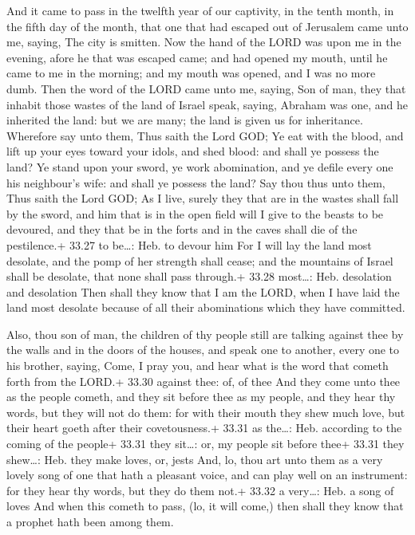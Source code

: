  And it came to pass in the twelfth year of our
captivity, in the tenth month, in the fifth day of the month, that one
that had escaped out of Jerusalem came unto me, saying, The city is
smitten.  Now the hand of the LORD was upon me in the
evening, afore he that was escaped came; and had opened my mouth, until
he came to me in the morning; and my mouth was opened, and I was no more
dumb.  Then the word of the LORD came unto me, saying,
 Son of man, they that inhabit those wastes of the land of
Israel speak, saying, Abraham was one, and he inherited the land: but we
are many; the land is given us for inheritance.  Wherefore
say unto them, Thus saith the Lord GOD; Ye eat with the blood, and lift
up your eyes toward your idols, and shed blood: and shall ye possess the
land?  Ye stand upon your sword, ye work abomination, and
ye defile every one his neighbour's wife: and shall ye possess the land?
 Say thou thus unto them, Thus saith the Lord GOD; As I
live, surely they that are in the wastes shall fall by the sword, and
him that is in the open field will I give to the beasts to be devoured,
and they that be in the forts and in the caves shall die of the
pestilence.+ 33.27 to be\ldots: Heb. to devour him  For I
will lay the land most desolate, and the pomp of her strength shall
cease; and the mountains of Israel shall be desolate, that none shall
pass through.+ 33.28 most\ldots: Heb. desolation and desolation
 Then shall they know that I am the LORD, when I have laid
the land most desolate because of all their abominations which they have
committed.

 Also, thou son of man, the children of thy people still
are talking against thee by the walls and in the doors of the houses,
and speak one to another, every one to his brother, saying, Come, I pray
you, and hear what is the word that cometh forth from the LORD.+ 33.30
against thee: of, of thee  And they come unto thee as the
people cometh, and they sit before thee as my people, and they hear thy
words, but they will not do them: for with their mouth they shew much
love, but their heart goeth after their covetousness.+ 33.31 as
the\ldots: Heb. according to the coming of the people+ 33.31 they
sit\ldots: or, my people sit before thee+ 33.31 they shew\ldots: Heb.
they make loves, or, jests  And, lo, thou art unto them as
a very lovely song of one that hath a pleasant voice, and can play well
on an instrument: for they hear thy words, but they do them not.+ 33.32
a very\ldots: Heb. a song of loves  And when this cometh to
pass, (lo, it will come,) then shall they know that a prophet hath been
among them.

